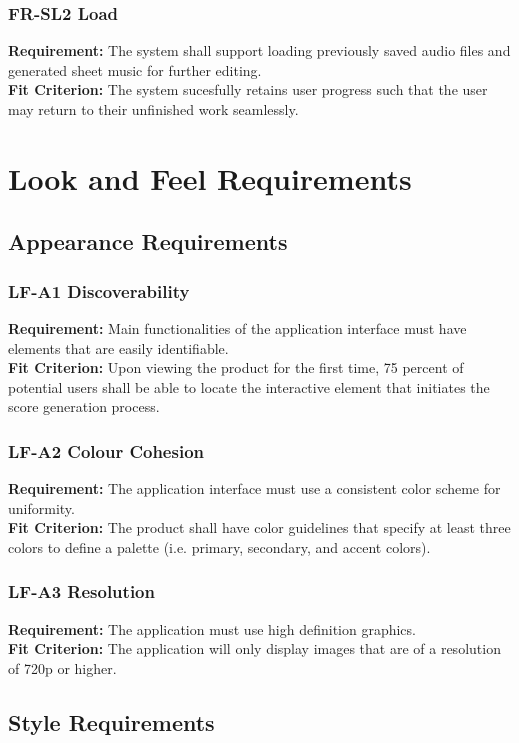 \documentclass[12pt]{article}
\begin{document}
\subsubsection*{FR-SL2 Load}
\textbf{Requirement:} The system shall support loading previously saved audio files and generated sheet music for further editing. \\
\textbf{Fit Criterion:} The system sucesfully retains user progress such that the user may return to their unfinished work seamlessly.


\section{Look and Feel Requirements}
\subsection{Appearance Requirements}
\subsubsection*{LF-A1 Discoverability}
\textbf{Requirement:} Main functionalities of the application interface must have elements that are easily identifiable.\\
\textbf{Fit Criterion:} Upon viewing the product for the first time, 75 percent of potential 
users shall be able to locate the interactive element that initiates the score generation process.
\subsubsection*{LF-A2 Colour Cohesion}
\textbf{Requirement:} The application interface must use a consistent color scheme for uniformity.\\
\textbf{Fit Criterion:} The product shall have color guidelines that specify at least three colors to define a palette 
(i.e. primary, secondary, and accent colors).
\subsubsection*{LF-A3 Resolution}
\textbf{Requirement:} The application must use high definition graphics.\\
\textbf{Fit Criterion:} The application will only display images that are of a resolution of 720p or higher.
\subsection{Style Requirements}
\end{document}
